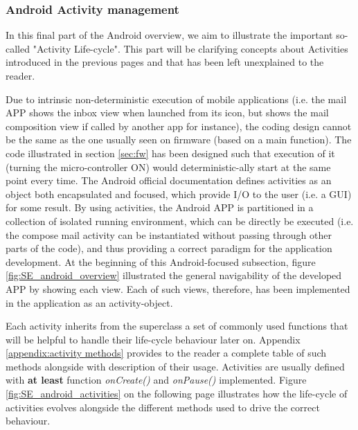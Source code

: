 \vspace{0.5cm}

\vspace{0.5cm}

\subsubsection{Android Activity management}
\label{subsubsec:android-activities} 

In this final part of the Android overview, we aim to illustrate the important so-called "Activity Life-cycle". This part will be clarifying concepts about Activities introduced in the previous pages and that has been left unexplained to the reader. 

\medskip
Due to intrinsic non-deterministic execution of mobile applications (i.e. the mail APP shows the inbox view when launched from its icon, but shows the mail composition view if called by another app for instance), the coding design cannot be the same as the one usually seen on firmware (based on a main function). The code illustrated in section \ref{sec:fw} has been designed such that execution of it (turning the micro-controller ON) would deterministic-ally start at the same point every time. The Android official documentation defines activities as an object both encapsulated and focused, which provide I/O to the user (i.e. a GUI) for some result. By using activities, the Android APP is partitioned in a collection of isolated running environment, which can be directly be executed (i.e. the compose mail activity can be instantiated without passing through other parts of the code), and thus providing a correct paradigm for the application development. At the beginning of this Android-focused subsection, figure \ref{fig:SE_android_overview} illustrated the general navigability of the developed APP by showing each view. Each of such views, therefore, has been implemented in the application as an activity-object.

\medskip
Each activity inherits from the superclass a set of commonly used functions that will be helpful to handle their life-cycle behaviour later on. Appendix \ref{appendix:activity methods} provides to the reader a complete table of such methods alongside with description of their usage. Activities are usually defined with \textbf{at least} function \textit{onCreate()} and \textit{onPause()} implemented. Figure \ref{fig:SE_android_activities} on the following page illustrates how the life-cycle of activities evolves alongside the different methods used to drive the correct behaviour.

